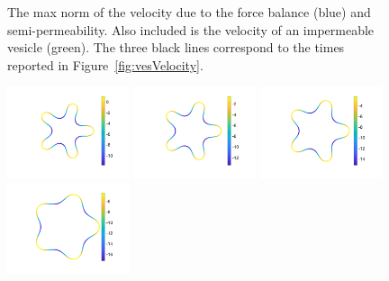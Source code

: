 \documentclass[aps,prl,showpacs]{revtex4}
\newif\ifTikz
\begin{document}
\begin{figure}[htp]
  
  \caption{\label{fig:vesVelocityNorm} The max norm of the velocity due
  to the force balance (blue) and semi-permeability. Also included is
  the velocity of an impermeable vesicle (green). The three black lines
  correspond to the times reported in Figure~\ref{fig:vesVelocity}.}
\end{figure}



\begin{figure}[htp]
\begin{minipage}{0.40\textwidth}
\ifTikz

\fi
\end{minipage}
\hfill
\begin{minipage}{0.55\textwidth}
  \centering
\includegraphics[width=0.32\textwidth]{figures/StarTensionTime1.pdf}
\includegraphics[width=0.32\textwidth]{figures/StarTensionTime2.pdf}
\includegraphics[width=0.32\textwidth]{figures/StarTensionTime3.pdf} \\
\includegraphics[width=0.32\textwidth]{figures/StarTensionTime4.pdf}

\end{minipage}
\end{figure}
\end{document}
